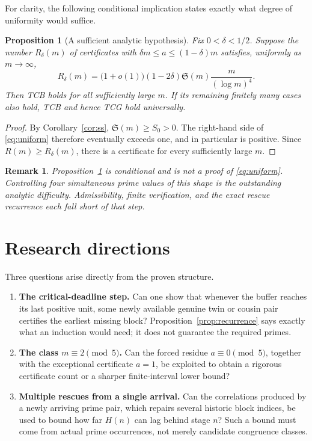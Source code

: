 \documentclass[11pt,a4paper]{article}
\numberwithin{equation}{section}
\newtheorem{proposition}[conjecture]{Proposition}
\newtheorem{remark}[conjecture]{Remark}
\theoremstyle{definition}
\newcommand{\SM}{\mathfrak{S}}
\begin{document}
For clarity, the following conditional implication states exactly what degree of uniformity would suffice.
\begin{proposition}[A sufficient analytic hypothesis]\label{prop:conditional}
Fix \(0<\delta<1/2\). Suppose the number \(R_\delta(m)\) of certificates with \(\delta m\le a\le(1-\delta)m\) satisfies, uniformly as \(m\to\infty\),
\begin{equation}\label{eq:uniform}
R_\delta(m)=\bigl(1+o(1)\bigr)(1-2\delta)\SM(m)\frac{m}{(\log m)^4}.
\end{equation}
Then TCB holds for all sufficiently large \(m\). If its remaining finitely many cases also hold, TCB and hence TCG hold universally.
\end{proposition}
\begin{proof}
By Corollary~\ref{cor:ss}, \(\SM(m)\ge S_0>0\). The right-hand side of \eqref{eq:uniform} therefore eventually exceeds one, and in particular is positive. Since \(R(m)\ge R_\delta(m)\), there is a certificate for every sufficiently large \(m\).
\end{proof}
\begin{remark}
Proposition~\ref{prop:conditional} is conditional and is not a proof of \eqref{eq:uniform}. Controlling four simultaneous prime values of this shape is the outstanding analytic difficulty. Admissibility, finite verification, and the exact rescue recurrence each fall short of that step.
\end{remark}

\section{Research directions}
Three questions arise directly from the proven structure.
\begin{enumerate}[label=\textup{(\roman*)},leftmargin=22pt]
\item \textbf{The critical-deadline step.} Can one show that whenever the buffer reaches its last positive unit, some newly available genuine twin or cousin pair certifies the earliest missing block? Proposition~\ref{prop:recurrence} says exactly what an induction would need; it does not guarantee the required primes.
\item \textbf{The class \(m\equiv2\pmod5\).} Can the forced residue \(a\equiv0\pmod5\), together with the exceptional certificate \(a=1\), be exploited to obtain a rigorous certificate count or a sharper finite-interval lower bound?
\item \textbf{Multiple rescues from a single arrival.} Can the correlations produced by a newly arriving prime pair, which repairs several historic block indices, be used to bound how far \(H(n)\) can lag behind stage \(n\)? Such a bound must come from actual prime occurrences, not merely candidate congruence classes.
\end{enumerate}
\end{document}
